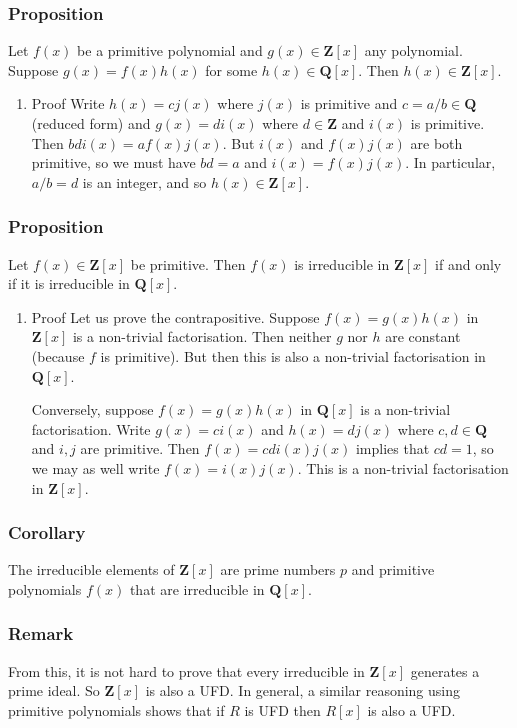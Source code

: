 \documentclass[11pt]{article}
\begin{document}
\subsubsection{Proposition}
\label{sec:org3155bd1}
Let \(f(x)\) be a primitive polynomial and \(g(x) \in \mathbf{Z}[x]\) any polynomial.
Suppose \(g(x) = f(x) h(x)\) for some \(h(x) \in \mathbf{Q}[x]\).
Then \(h(x) \in \mathbf{Z}[x]\).
\begin{enumerate}
\item Proof
\label{sec:orga61b2e4}
Write \(h(x) = c j(x)\) where \(j(x)\) is primitive and \(c = a/b \in \mathbf{Q}\) (reduced form) and \(g(x) = d i(x)\) where \(d \in \mathbf{Z}\) and \(i(x)\) is primitive.
Then \(bd i(x) = a f(x) j(x)\).
But \(i(x)\) and \(f(x)j(x)\) are both primitive, so we must have \(bd = a\) and \(i(x) = f(x)j(x)\).
In particular, \(a/b = d\) is an integer, and so \(h(x) \in \mathbf{Z}[x]\).
\end{enumerate}
\subsubsection{Proposition}
\label{sec:org443a9a1}
Let \(f(x) \in \mathbf{Z}[x]\) be primitive.
Then \(f(x)\) is irreducible in \(\mathbf{Z}[x]\) if and only if it is irreducible in \(\mathbf{Q}[x]\).
\begin{enumerate}
\item Proof
\label{sec:orga04fc43}
Let us prove the contrapositive.
Suppose \(f(x) = g(x) h(x)\) in \(\mathbf{Z}[x]\) is a non-trivial factorisation.
Then neither \(g\) nor \(h\) are constant (because \(f\) is primitive).
But then this is also a non-trivial factorisation in \(\mathbf{Q}[x]\).

Conversely, suppose \(f(x) = g(x) h(x)\) in \(\mathbf{Q}[x]\) is a non-trivial factorisation.
Write \(g(x) = c i(x)\) and \(h(x) = d j(x)\) where \(c,d \in \mathbf{Q}\) and \(i,j\) are primitive.
Then \(f(x) = cd i(x)j(x)\) implies that \(cd = 1\), so we may as well write
\(f(x) = i(x) j(x)\).
This is a non-trivial factorisation in \(\mathbf{Z}[x]\).
\end{enumerate}
\subsubsection{Corollary}
\label{sec:org909cfbd}
The irreducible elements of \(\mathbf{Z}[x]\) are prime numbers \(p\) and primitive polynomials \(f(x)\) that are irreducible in \(\mathbf{Q}[x]\).
\subsubsection{Remark}
\label{sec:org1f3b32b}
From this, it is not hard to prove that every irreducible in \(\mathbf{Z}[x]\) generates a prime ideal.
So \(\mathbf{Z}[x]\) is also a UFD.  
In general, a similar reasoning using primitive polynomials shows that if \(R\) is UFD then \(R[x]\) is also a UFD.
\end{document}
